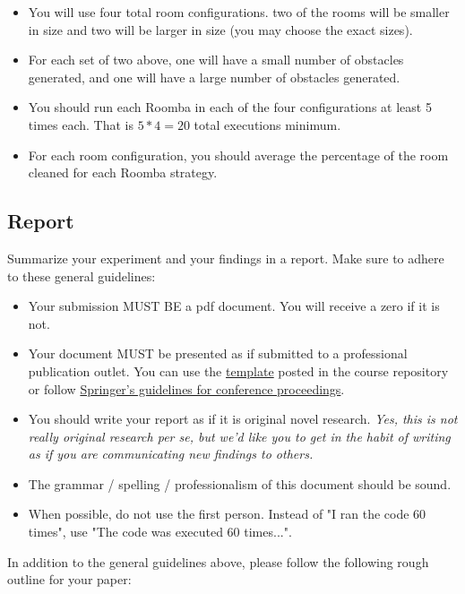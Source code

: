 \documentclass[paper=a4, fontsize=11pt, parskip=full]{scrartcl} %
\numberwithin{equation}{section} %
\numberwithin{figure}{section} %
\numberwithin{table}{section} %
\begin{document}
\begin{itemize}
	\item You will use four total room configurations. two of the rooms will be smaller in size and two will be larger in size (you may choose the exact sizes).
	\item For each set of two above, one will have a small number of obstacles generated, and one will have a large number of obstacles generated.
	\item You should run each Roomba in each of the four configurations at least 5 times each. That is $5 * 4 = 20$ total executions minimum.
	\item For each room configuration, you should average the percentage of the room cleaned for each Roomba strategy.
\end{itemize}

\subsection{Report}

Summarize your experiment and your findings in a report. Make sure to adhere to these general guidelines:

\begin{itemize}
	\item Your submission MUST BE a pdf document. You will receive a zero if it is not.
	\item Your document MUST be presented as if submitted to a professional publication outlet. You can use the \href{https://uva-cs.github.io/dsa1/homeworks/WordPaperTemplate.zip}{template} posted in the course repository or follow \href{https://www.springer.com/us/computer-science/lncs/conference-proceedings-guidelines}{Springer's guidelines for conference proceedings}.
	\item You should write your report as if it is original novel research. \emph{Yes, this is not really original research per se, but we'd like you to get in the habit of writing as if you are communicating new findings to others.}
	\item The grammar / spelling / professionalism of this document should be sound.
	\item When possible, do not use the first person. Instead of "I ran the code 60 times", use "The code was executed 60 times...".
\end{itemize}

In addition to the general guidelines above, please follow the following rough outline for your paper:
\end{document}
